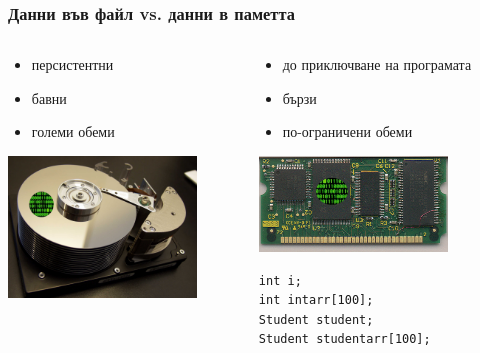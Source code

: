 \documentclass{beamer}
\begin{document}
\begin{frame}[fragile]
\frametitle{Данни във файл vs. данни в паметта}


\begin{columns}[t]
  \begin{column}{0.5\textwidth}
\begin{center}

\begin{flushleft}
\begin{itemize}
  \item персистентни
  \item бавни
  \item големи обеми 
\end{itemize}
\end{flushleft}

\vspace{20px}

   \includegraphics[width=5cm]{images/harddisk-oneszeros}
\end{center}
  \end{column}
  \begin{column}{0.5\textwidth}
\begin{center}

\begin{flushleft}
\begin{itemize}
  \item до приключване на програмата
  \item бързи
  \item по-ограничени обеми  
\end{itemize}
\end{flushleft}
\vspace{20px}


   \includegraphics[width=5cm]{images/ramchip-oneszeros}
   \pause
\begin{flushleft}
\begin{lstlisting}
int i;
int intarr[100];
Student student;
Student studentarr[100];
\end{lstlisting}
\end{flushleft}   
\end{center}
  \end{column}
\end{columns}




\end{frame}
\end{document}
